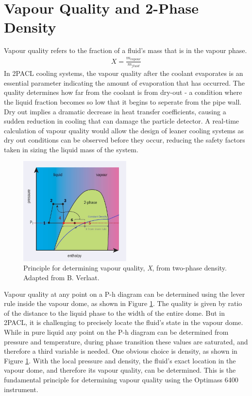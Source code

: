 \documentclass{report}
\begin{document}
\section{Vapour Quality and 2-Phase Density}
\FloatBarrier
Vapour quality refers to the fraction of a fluid's mass that is in the vapour phase.
\begin{eqnarray}
X=\frac{m_{vapour}}{m_{fluid}}
\end{eqnarray}
In 2PACL cooling systems, the vapour quality after the coolant evaporates is an essential parameter indicating the amount of evaporation that has occurred. The quality determines how far from the coolant is from dry-out - a condition where the liquid fraction becomes so low that it begins to seperate from the pipe wall. Dry out implies a dramatic decrease in heat transfer coefficients, causing a sudden reduction in cooling that can damage the particle detector. A real-time calculation of vapour quality would allow the design of leaner cooling systems as dry out conditions can be observed before they occur, reducing the safety factors taken in sizing the liquid mass of the system.\\
\FloatBarrier
\begin{figure}
\includegraphics[width=0.5\textwidth]{densityMethod.jpg}
\caption{Principle for determining vapour quality, \textit{X}, from two-phase density. Adapted from B. Verlaat. \cite{CERN courier}}
\label{fig:densityMethod}
\end{figure}
\FloatBarrier
Vapour quality at any point on a P-h diagram can be determined using the lever rule inside the vapour dome, as shown in Figure \ref{fig:densityMethod}. The quality is given by ratio of the distance to the liquid phase to the width of the entire dome. But in 2PACL, it is challenging to precisely locate the fluid's state in the vapour dome. \\
While in pure liquid any point on the P-h diagram can be determined from pressure and temperature, during phase transition these values are saturated, and therefore a third variable is needed. One obvious choice is density, as shown in Figure \ref{fig:densityMethod}. With the local pressure and density, the fluid's exact location in the vapour dome, and therefore its vapour quality, can be determined. This is the fundamental principle for determining vapour quality using the Optimass 6400 instrument.
\end{document}
